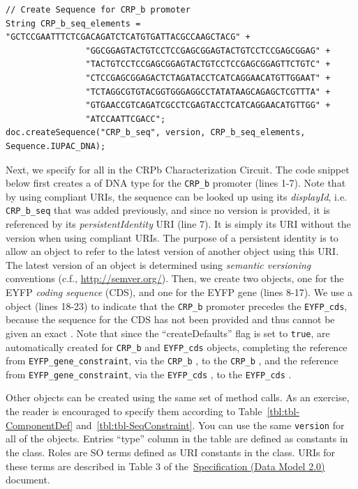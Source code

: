 \begin{minipage}{0.95\textwidth}
\begin{lstlisting}[basicstyle=\tt\footnotesize]
// Create Sequence for CRP_b promoter
String CRP_b_seq_elements =  "GCTCCGAATTTCTCGACAGATCTCATGTGATTACGCCAAGCTACG" +
                "GGCGGAGTACTGTCCTCCGAGCGGAGTACTGTCCTCCGAGCGGAG" +
                "TACTGTCCTCCGAGCGGAGTACTGTCCTCCGAGCGGAGTTCTGTC" +
                "CTCCGAGCGGAGACTCTAGATACCTCATCAGGAACATGTTGGAAT" +
                "TCTAGGCGTGTACGGTGGGAGGCCTATATAAGCAGAGCTCGTTTA" +
                "GTGAACCGTCAGATCGCCTCGAGTACCTCATCAGGAACATGTTGG" +
                "ATCCAATTCGACC";
doc.createSequence("CRP_b_seq", version, CRP_b_seq_elements, Sequence.IUPAC_DNA);
\end{lstlisting}
\end{minipage}

Next, we specify  for all  in the CRPb Characterization Circuit. The code snippet below first creates a  of DNA type for the \lstinline+CRP_b+ promoter (lines 1-7). Note that by using compliant URIs, the sequence can be looked up using its \emph{displayId}, i.e. \lstinline+CRP_b_seq+ that was added previously, and since no version is provided, it is referenced by its \emph{persistentIdentity} URI (line 7). It is simply its URI without the version when using compliant URIs. The purpose of a persistent identity is to allow an object to refer to the latest version of another object using this URI. The latest version of an object is determined using \emph{semantic versioning} conventions (c.f., \url{http://semver.org/}). Then, we create two  objects, one for the EYFP \emph{coding sequence} (CDS), and one for the EYFP gene (lines 8-17). We use a  object (lines 18-23) to indicate that the \lstinline+CRP_b+ promoter precedes the \lstinline+EYFP_cds+, because the sequence for the CDS has not been provided and thus cannot be given an exact . Note that since the ``createDefaults'' flag is set to \lstinline+true+,  are automatically created for \lstinline+CRP_b+ and \lstinline+EYFP_cds+  objects, completing the reference from \lstinline+EYFP_gene_constraint+, via the \lstinline+CRP_b+ , to the \lstinline+CRP_b+ , and the reference from \lstinline+EYFP_gene_constraint+, via the \lstinline+EYFP_cds+ , to the \lstinline+EYFP_cds+ . 

Other  objects can be created using the same set of method calls. As an exercise, the reader is encouraged to specify them according to Table~\ref{tbl:tbl-ComponentDef} and~\ref{tbl:tbl-SeqConstraint}. You can use the same \lstinline+version+ for all of the  objects. Entries ``type'' column in the table are defined as constants in the  class. Roles are SO terms defined as URI constants in the  class. URIs for these terms are described in Table 3 of the~\href{http://sbolstandard.org/downloads/specification-data-model-2-0/}{Specification  (Data Model 2.0)} document.

